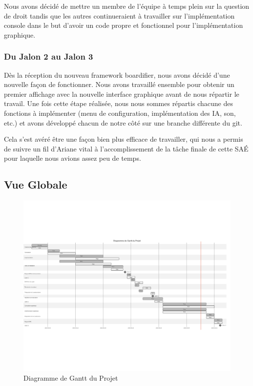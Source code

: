 Nous avons décidé de mettre un membre de l'équipe à temps plein sur la question de droit tandis que les autres continueraient à travailler sur l'implémentation console dans le but d'avoir un code propre et fonctionnel pour l'implémentation graphique.

\subsubsection{Du Jalon 2 au Jalon 3}

Dès la réception du nouveau framework boardifier, nous avons décidé d'une nouvelle façon de fonctionner.
Nous avons travaillé ensemble pour obtenir un premier affichage avec la nouvelle interface graphique avant de nous répartir le travail.
Une fois cette étape réalisée, nous nous sommes répartis chacune des fonctions à implémenter (menu de configuration, implémentation des IA, son, etc.) et avons développé chacun de notre côté sur une branche différente du git.

Cela s'est avéré être une façon bien plus efficace de travailler, qui nous a permis de suivre un fil d'Ariane vital à l'accomplissement de la tâche finale de cette SAÉ pour laquelle nous avions assez peu de temps.

\subsection{Vue Globale}


\begin{figure}[!h]
	\centering
	\includegraphics[width=\textwidth,angle=0]{./images/mermaid-diagram}
	\caption{Diagramme de Gantt du Projet}
	\label{fig:gantt}
\end{figure}


